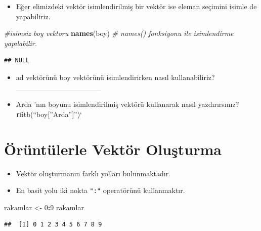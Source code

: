 \documentclass[
  oneside]{book}
\newenvironment{Shaded}{\begin{snugshade}}{\end{snugshade}}
\newcommand{\CommentTok}[1]{\textcolor[rgb]{0.56,0.35,0.01}{\textit{#1}}}
\newcommand{\DecValTok}[1]{\textcolor[rgb]{0.00,0.00,0.81}{#1}}
\newcommand{\FunctionTok}[1]{\textcolor[rgb]{0.13,0.29,0.53}{\textbf{#1}}}
\newcommand{\NormalTok}[1]{#1}
\newcommand{\OtherTok}[1]{\textcolor[rgb]{0.56,0.35,0.01}{#1}}
\newcommand{\SpecialCharTok}[1]{\textcolor[rgb]{0.81,0.36,0.00}{\textbf{#1}}}
\providecommand{\tightlist}{%
  \setlength{\itemsep}{0pt}\setlength{\parskip}{0pt}}
\begin{document}
\begin{itemize}
\tightlist
\item
  Eğer elimizdeki vektör isimlendirilmiş bir vektör ise eleman seçimini isimle de yapabiliriz.
\end{itemize}

\begin{Shaded}
\begin{Highlighting}[]
\CommentTok{\#isimsiz boy vektoru}
\FunctionTok{names}\NormalTok{(boy) }\CommentTok{\# names() fonksiyonu ile isimlendirme yapılabilir.}
\end{Highlighting}
\end{Shaded}

\begin{verbatim}
## NULL
\end{verbatim}

\begin{itemize}
\item
  ad vektörünü boy vektörünü isimlendirirken nasıl kullanabiliriz? \_\_\_\_\_\_\_\_\_\_\_\_\_\_\_\_
\item
  Arda 'nın boyunu isimlendirilmiş vektörü kullanarak nasıl yazdırırsınız? \texttt{r}fitb(``boy{[}''Arda''{]}'')`
\end{itemize}

\hypertarget{uxf6ruxfcntuxfclerle-vektuxf6r-oluux15fturma}{%
\section{Örüntülerle Vektör Oluşturma}\label{uxf6ruxfcntuxfclerle-vektuxf6r-oluux15fturma}}

\begin{itemize}
\item
  Vektör oluşturmanın farklı yolları bulunmaktadır.
\item
  En basit yolu iki nokta \texttt{":"} operatörünü kullanmaktır.
\end{itemize}

\begin{Shaded}
\begin{Highlighting}[]
\NormalTok{rakamlar }\OtherTok{\textless{}{-}} \DecValTok{0}\SpecialCharTok{:}\DecValTok{9}
\NormalTok{rakamlar}
\end{Highlighting}
\end{Shaded}

\begin{verbatim}
##  [1] 0 1 2 3 4 5 6 7 8 9
\end{verbatim}
\end{document}
